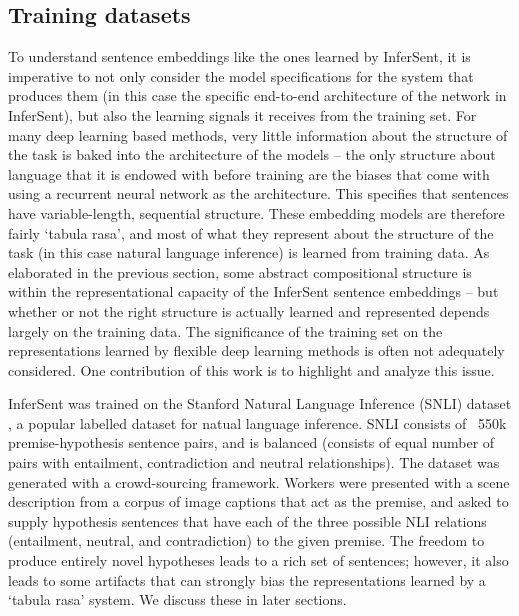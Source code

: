 \subsection{Training datasets}
To understand sentence embeddings like the ones learned by InferSent, it is imperative to not only consider the model specifications for the system that produces them (in this case the specific end-to-end architecture of the network in InferSent), but also the learning signals it receives from the training set. For many deep learning based methods, very little information about the structure of the task is baked into the architecture of the models -- the only structure about language that it is endowed with before training are the biases that come with using a recurrent neural network as the architecture. This specifies that sentences have variable-length, sequential structure. These embedding models are therefore fairly `tabula rasa', and most of what they represent about the structure of the task (in this case natural language inference) is learned from training data. As elaborated in the previous section, some abstract compositional structure is within the representational capacity of the InferSent sentence embeddings -- but whether or not the right structure is actually learned and represented depends largely on the training data. The significance of the training set on the representations learned by flexible deep learning methods is often not adequately considered. One contribution of this work is to highlight and analyze this issue.
 
InferSent was trained on the Stanford Natural Language Inference (SNLI) dataset \citep{snli:emnlp2015}, a popular labelled dataset for natual language inference. SNLI consists of ~550k premise-hypothesis sentence pairs, and is balanced (consists of equal number of pairs with entailment, contradiction and neutral relationships). The dataset was generated with a crowd-sourcing framework. Workers were presented with a scene description from a corpus of image captions that act as the premise, and asked to supply hypothesis sentences that have each of the three possible NLI relations (entailment, neutral, and contradiction) to the given premise. The freedom to produce entirely novel hypotheses leads to a rich set of sentences; however, it also leads to some artifacts that can strongly bias the representations learned by a `tabula rasa' system. We discuss these in later sections.

